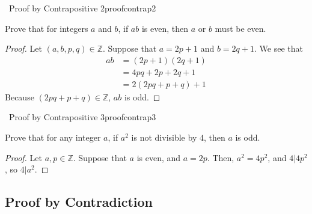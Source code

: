         \pagebreak
        \begin{exercise}{\Difficulty\,\Difficulty\,\,Proof by Contrapositive 2}{proofcontrap2}
        
        Prove that for integers \(a\) and \(b\), if \(ab\) is even, then \(a\) or \(b\) must be even.
        
        \begin{proof}
            Let \((a,b,p,q)\in\mathbb{Z}\). Suppose that \(a=2p+1\) and \(b=2q+1\). We see that
            \begin{align*}
                ab&=(2p+1)(2q+1) \\
                &=4pq+2p+2q+1 \\
                &=2(2pq+p+q)+1
            \end{align*}
            Because \((2pq+p+q)\in\mathbb{Z}\), \(ab\) is odd.
        \end{proof}
        
        \end{exercise}
        \begin{exercise}{\Difficulty\,\Difficulty\,\,Proof by Contrapositive 3}{proofcontrap3}
        
        Prove that for any integer \(a\), if \(a^2\) is not divisible by \(4\), then \(a\) is odd.
        
        \begin{proof}
            Let \(a,p\in\mathbb{Z}\). Suppose that \(a\) is even, and \(a=2p\). Then, \(a^2=4p^2\), and \(4|4p^2\), so \(4|a^2\).
        \end{proof}
        
        \end{exercise}
        
    \subsection{Proof by Contradiction}
    
